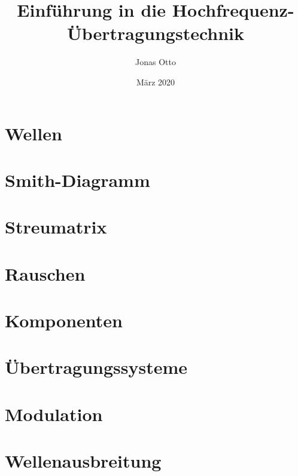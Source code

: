 \documentclass{report}
\title{Einführung in die Hochfrequenz-Übertragungstechnik}
\author{Jonas Otto}
\date{März 2020}
\begin{document}
\tableofcontents
\maketitle

\chapter{Wellen}



\chapter{Smith-Diagramm}

\chapter{Streumatrix}

\chapter{Rauschen}

\chapter{Komponenten}

\chapter{Übertragungssysteme}

\chapter{Modulation}

\chapter{Wellenausbreitung}
\end{document}
